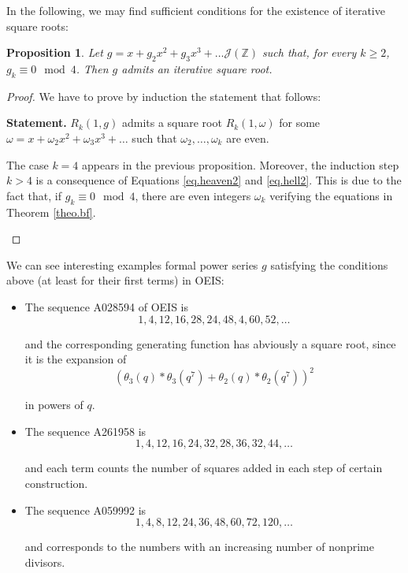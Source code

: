 \documentclass[preprint,12pt]{elsarticle}
\newtheorem{prop}[thm]{Proposition}
\begin{document}
In the following, we may find sufficient conditions for the existence of iterative square roots:

\begin{prop} Let $g=x+g_2x^2+g_3x^3+\ldots\mathcal J(\mathbb Z)$ such that, for every $k\geq 2$, $g_k\equiv 0\mod 4$. Then $g$ admits an iterative square root. \end{prop}



\begin{proof} We have to prove by induction the statement that follows:

\medskip

\noindent \textbf{Statement.} $R_k(1,g)$ admits a square root $R_k(1,\omega)$ for some $\omega=x+\omega_2x^2+\omega_3x^3+\ldots$ such that $\omega_2,\ldots,\omega_k$ are even.


\medskip

The case $k = 4$ appears in the previous proposition. Moreover, the induction step $k > 4$ is a consequence of Equations \eqref{eq.heaven2} and \eqref{eq.hell2}. This is due to the fact that, if $g_k \equiv 0\mod 4$, there are even integers $\omega_k$ verifying the equations in Theorem \ref{theo.bf}.

$ $
\end{proof}



We can see interesting examples formal power series $g$ satisfying the conditions above (at least for their first terms) in OEIS:


\begin{itemize}

\item The sequence A028594 of OEIS is 
$$	1, 4, 12, 16, 28, 24, 48, 4, 60, 52,\ldots$$

\noindent and the corresponding generating function has abviously a square root, since it is the expansion of
$$(\theta_3(q) * \theta_3(q^7) + \theta_2(q) * \theta_2(q^7))^2$$

\noindent in powers of $q$.


\item The sequence A261958 is
$$1, 4, 12, 16, 24, 32, 28, 36, 32, 44,\ldots$$

\noindent and each term counts the number of squares added in each step of certain construction.



\item  The sequence A059992 is
$$ 1, 4, 8, 12, 24, 36, 48, 60, 72, 120, \ldots$$



\noindent and corresponds to the numbers with an increasing number of nonprime divisors. 




\end{itemize}
\end{document}
